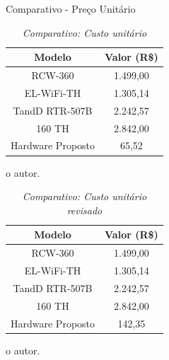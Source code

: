 \begin{frame}{Comparativo - Preço Unitário}

    \begin{table}[!h]
	
	\captionsetup{width=7cm}%
	\caption{\label{tab:compara_custo} \textit{Comparativo: Custo unitário}}%
	
		\begin{tabular}{cc}
			\toprule
			Modelo & Valor (R\$)\\
			\midrule \midrule
           RCW-360           & 1.499,00  \\
           EL-WiFi-TH        & 1.305,14  \\
           TandD RTR-507B    & 2.242,57 \\
           160 TH            & 2.842,00  \\
           Hardware Proposto & 65,52  \\
	    \bottomrule
		\end{tabular}%

	\tiny{o autor.}%

    \end{table}    
    
    
    \begin{table}[!h]
	
	\captionsetup{width=7cm}%
	\caption{\label{tab:custos_extras} \textit{Comparativo: Custo unitário revisado}}%
	
		\begin{tabular}{cc}
			\toprule
			Modelo & Valor (R\$)\\
			\midrule \midrule
           RCW-360           & 1.499,00  \\
           EL-WiFi-TH        & 1.305,14  \\
           TandD RTR-507B    & 2.242,57 \\
           160 TH            & 2.842,00  \\
           Hardware Proposto & 142,35  \\
	    \bottomrule
		\end{tabular}%
	
	\tiny{o autor.}%

    \end{table}
    
\end{frame}



